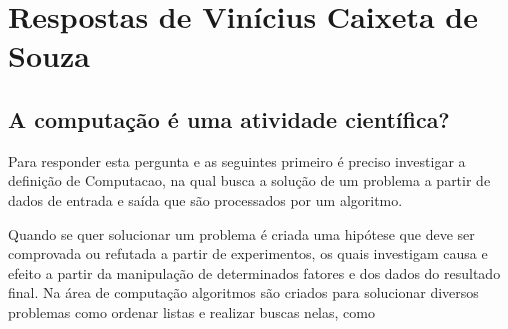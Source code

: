 \section{Respostas de Vinícius Caixeta de Souza}

\subsection{A computação é uma atividade científica?}
Para responder esta pergunta e as seguintes primeiro é preciso investigar a definição de \gls{Computacao}, na qual busca a solução de um problema a partir de dados de entrada e saída que são processados por um algoritmo.

Quando se quer solucionar um problema é criada uma hipótese que deve ser comprovada ou refutada a partir de experimentos, os quais investigam causa e efeito a partir da manipulação de determinados fatores e dos dados do resultado final. Na área de computação algoritmos são criados para solucionar diversos problemas como ordenar listas e realizar buscas nelas, como 